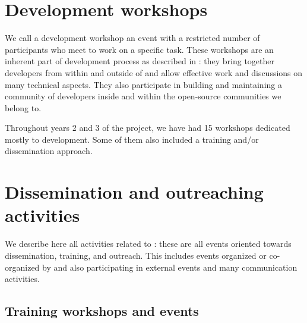 \documentclass{deliverablereport}
\author{Viviane Pons et al.}
\begin{document}
\maketitle
\githubissuedescription
\newpage
\tableofcontents
\newpage

\section{Development workshops}

We call a development workshop an event with a restricted number of participants
who meet to work on a specific task. These workshops are an inherent part
of \ODK development process as described in :
 they bring together
developers from within and outside of \ODK and allow effective work
and discussions on many technical aspects. They also participate in building
and maintaining a community of developers inside \ODK and within the
open-source communities we belong to.

Throughout years 2 and 3 of the project, we have had 15 workshops dedicated mostly
to development. Some of them also included a training and/or dissemination approach. 









\section{Dissemination and outreaching activities}


We describe here all activities related to :
these are all events oriented towards dissemination, training, and outreach. This
includes events organized or co-organized by \ODK and also
participating in external events and many communication activities.

\subsection{Training workshops and events}




\end{document}
